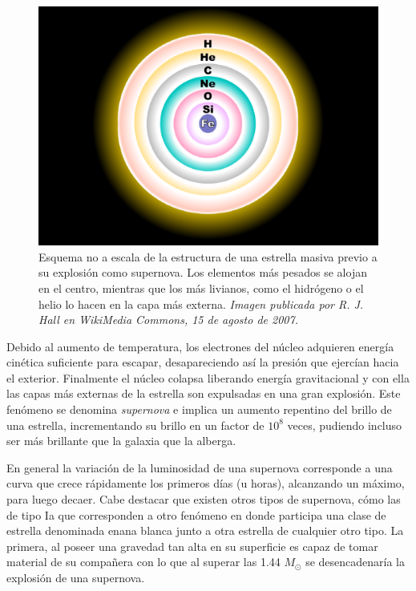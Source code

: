\begin{figure}[h!]
\centering
\includegraphics[scale=.25]{images/sncore}
\caption{Esquema no a escala de la estructura de una estrella masiva previo a su explosi\'on como supernova. Los elementos m\'as pesados se alojan en el centro, mientras que  los m\'as livianos, como el hidr\'ogeno o el helio lo hacen en la capa m\'as externa. \textit{Imagen publicada por R. J. Hall en WikiMedia Commons, 15 de agosto de 2007.}}
\label{fig:f0}
\end{figure}


Debido al aumento de temperatura, los electrones del n\'ucleo adquieren energ\'ia cin\'etica suficiente para escapar, desapareciendo as\'i la presi\'on que ejerc\'ian hacia el exterior. Finalmente el n\'ucleo colapsa liberando energ\'ia gravitacional y con ella las capas m\'as externas de la estrella son expulsadas en una gran explosi\'on. Este fen\'omeno se denomina \textit{supernova} e implica un aumento repentino del brillo de una estrella, incrementando su brillo en un factor de $10^8$ veces, pudiendo incluso ser m\'as brillante que la galaxia que la alberga.
\bigskip

En general la variaci\'on de la luminosidad de una supernova corresponde a una curva que crece r\'apidamente los primeros d\'ias (u horas), alcanzando un m\'aximo, para luego decaer. Cabe destacar que existen otros tipos de supernova, c\'omo las de tipo Ia que corresponden a otro fen\'omeno en donde participa una clase de estrella denominada enana blanca junto a otra estrella de cualquier otro tipo. La primera, al poseer una gravedad tan alta en su superficie es capaz de tomar material de su compa\~nera con lo que al superar las 1.44 $M_{\odot}$ se desencadenar\'ia la explosi\'on de una supernova. 
\bigskip

